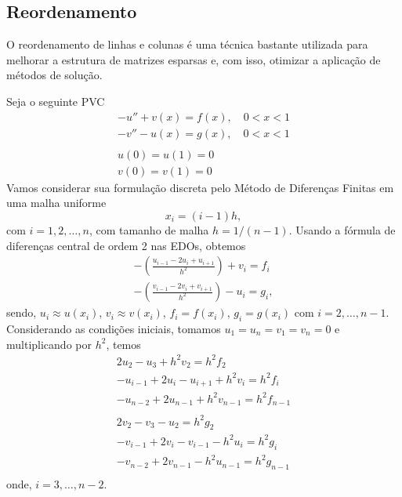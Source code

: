 \subsection{Reordenamento}

O reordenamento de linhas e colunas é uma técnica bastante utilizada para melhorar a estrutura de matrizes esparsas e, com isso, otimizar a aplicação de métodos de solução.

\begin{ex}\label{ex:reordenamento}
  Seja o seguinte PVC
  \begin{gather}
    -u'' + v(x) = f(x),\quad 0<x<1\\
    -v'' - u(x) = g(x),\quad 0<x<1\\
    ~\nonumber\\
    u(0)=u(1)=0\\
    v(0)=v(1)=0
  \end{gather}
  Vamos considerar sua formulação discreta pelo Método de Diferenças Finitas em uma malha uniforme
  \begin{equation}
    x_i = (i-1)h,
  \end{equation}
  com $i=1,2,\dotsc,n$, com tamanho de malha $h = 1/(n-1)$. Usando a fórmula de diferenças central de ordem 2 nas EDOs, obtemos
  \begin{gather}
    -\left(\frac{u_{i-1}-2u_i+u_{i+1}}{h^2}\right) + v_i = f_i\\
    -\left(\frac{v_{i-1}-2v_i+v_{i+1}}{h^2}\right) - u_i = g_i,
  \end{gather}
  sendo, $u_i \approx u(x_i)$, $v_i\approx v(x_i)$, $f_i=f(x_i)$, $g_i = g(x_i)$ com $i=2,\dotsc,n-1$. Considerando as condições iniciais, tomamos $u_1=u_n=v_1=v_n=0$ e multiplicando por $h^2$, temos
  \begin{gather}
    2u_2 - u_3 + h^2v_2 = h^2f_2\\
    -u_{i-1} + 2u_i -u_{i+1} + h^2v_i = h^2f_i\\
    -u_{n-2} + 2u_{n-1} + h^2v_{n-1} = h^2f_{n-1}\\
    ~\nonumber\\
    2v_2 - v_3 - u_2 = h^2g_2\\
    - v_{i-1} + 2v_i -v_{i-1} - h^2u_i = h^2g_i\\
    - v_{n-2} + 2v_{n-1}  - h^2u_{n-1} = h^2g_{n-1}\\    
  \end{gather}
  onde, $i=3,\dotsc,n-2$.


\end{ex}
